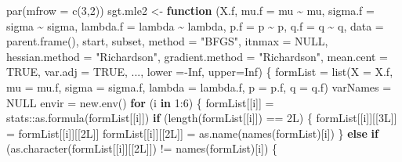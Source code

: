 \documentclass[a4paper, twoside]{templates/ociamthesis}
\newenvironment{Shaded}{\begin{snugshade}}{\end{snugshade}}
\newcommand{\AttributeTok}[1]{\textcolor[rgb]{0.77,0.63,0.00}{#1}}
\newcommand{\ConstantTok}[1]{\textcolor[rgb]{0.00,0.00,0.00}{#1}}
\newcommand{\ControlFlowTok}[1]{\textcolor[rgb]{0.13,0.29,0.53}{\textbf{#1}}}
\newcommand{\DecValTok}[1]{\textcolor[rgb]{0.00,0.00,0.81}{#1}}
\newcommand{\FunctionTok}[1]{\textcolor[rgb]{0.00,0.00,0.00}{#1}}
\newcommand{\NormalTok}[1]{#1}
\newcommand{\OtherTok}[1]{\textcolor[rgb]{0.56,0.35,0.01}{#1}}
\newcommand{\SpecialCharTok}[1]{\textcolor[rgb]{0.00,0.00,0.00}{#1}}
\newcommand{\StringTok}[1]{\textcolor[rgb]{0.31,0.60,0.02}{#1}}
\renewenvironment{Shaded}
{
  \vspace{10pt}%
  \begin{snugshade}%
}{%
  \end{snugshade}%
  \vspace{8pt}%
}
\begin{document}
\begin{Shaded}
\begin{Highlighting}[]
\FunctionTok{par}\NormalTok{(}\AttributeTok{mfrow =} \FunctionTok{c}\NormalTok{(}\DecValTok{3}\NormalTok{,}\DecValTok{2}\NormalTok{))}
\NormalTok{sgt.mle2 }\OtherTok{\textless{}{-}} \ControlFlowTok{function}\NormalTok{ (X.f, }\AttributeTok{mu.f =}\NormalTok{ mu }\SpecialCharTok{\textasciitilde{}}\NormalTok{ mu, }\AttributeTok{sigma.f =}\NormalTok{ sigma }\SpecialCharTok{\textasciitilde{}}\NormalTok{ sigma, }\AttributeTok{lambda.f =}\NormalTok{ lambda }\SpecialCharTok{\textasciitilde{}}\NormalTok{ lambda, }\AttributeTok{p.f =}\NormalTok{ p }\SpecialCharTok{\textasciitilde{}}\NormalTok{ p, }\AttributeTok{q.f =}\NormalTok{ q }\SpecialCharTok{\textasciitilde{}}\NormalTok{ q, }\AttributeTok{data =} \FunctionTok{parent.frame}\NormalTok{(), start, subset, }\AttributeTok{method =} \StringTok{"BFGS"}\NormalTok{, }\AttributeTok{itnmax =} \ConstantTok{NULL}\NormalTok{, }\AttributeTok{hessian.method =} \StringTok{"Richardson"}\NormalTok{, }\AttributeTok{gradient.method =} \StringTok{"Richardson"}\NormalTok{, }\AttributeTok{mean.cent =} \ConstantTok{TRUE}\NormalTok{, }\AttributeTok{var.adj =} \ConstantTok{TRUE}\NormalTok{, ..., }\AttributeTok{lower =}\SpecialCharTok{{-}}\ConstantTok{Inf}\NormalTok{, }\AttributeTok{upper=}\ConstantTok{Inf}\NormalTok{) }
\NormalTok{  \{ formList }\OtherTok{=} \FunctionTok{list}\NormalTok{(}\AttributeTok{X =}\NormalTok{ X.f, }\AttributeTok{mu =}\NormalTok{ mu.f, }\AttributeTok{sigma =}\NormalTok{ sigma.f, }\AttributeTok{lambda =}\NormalTok{ lambda.f, }
                  \AttributeTok{p =}\NormalTok{ p.f, }\AttributeTok{q =}\NormalTok{ q.f)}
\NormalTok{  varNames }\OtherTok{=} \ConstantTok{NULL}
\NormalTok{  envir }\OtherTok{=} \FunctionTok{new.env}\NormalTok{()}
  \ControlFlowTok{for}\NormalTok{ (i }\ControlFlowTok{in} \DecValTok{1}\SpecialCharTok{:}\DecValTok{6}\NormalTok{) \{}
\NormalTok{    formList[[i]] }\OtherTok{=}\NormalTok{ stats}\SpecialCharTok{::}\FunctionTok{as.formula}\NormalTok{(formList[[i]])}
    \ControlFlowTok{if}\NormalTok{ (}\FunctionTok{length}\NormalTok{(formList[[i]]) }\SpecialCharTok{==}\NormalTok{ 2L) \{}
\NormalTok{      formList[[i]][[3L]] }\OtherTok{=}\NormalTok{ formList[[i]][[2L]]}
\NormalTok{      formList[[i]][[2L]] }\OtherTok{=} \FunctionTok{as.name}\NormalTok{(}\FunctionTok{names}\NormalTok{(formList)[i])}
\NormalTok{    \}}
    \ControlFlowTok{else} \ControlFlowTok{if}\NormalTok{ (}\FunctionTok{as.character}\NormalTok{(formList[[i]][[2L]]) }\SpecialCharTok{!=} \FunctionTok{names}\NormalTok{(formList)[i]) \{}

\end{Highlighting}
\end{Shaded}
\end{document}
